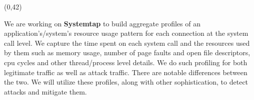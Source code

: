 \documentclass{article}
\def\CHead#1{\begin{center}\noindent{\LARGE\color{DarkBlue} #1}\end{center}}
\renewcommand{\LARGE}{\fontsize{43}{54}\selectfont}
\renewcommand{\Huge}{\fontsize{61.92}{77}\selectfont}
\begin{document}

\begin{textblock}{26}(0,42)
\begin{tcolorbox}[boxsep=1pt,colback=yellow!5!white]
	We are working on \textbf{Systemtap} to build aggregate profiles of an application's/system's resource usage pattern for each connection at the system call level. We capture the time spent on each system call and the resources used by them such as memory usage, number of page faults and open file descriptors, cpu cycles and other thread/process level details. We do such profiling for both legitimate traffic as well as attack traffic. There are notable differences between the two. We will utilize these profiles, along with other sophistication, to detect attacks and mitigate them. 
\end{tcolorbox}
\end{textblock}








\end{document}
